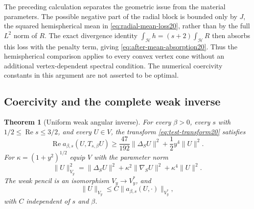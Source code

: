 \documentclass[11pt,a4paper]{article}
\newtheorem{theorem}{Theorem}[section]
\theoremstyle{remark}
\numberwithin{equation}{section}
\begin{document}
The preceding calculation separates the geometric issue from the material
parameters. The possible negative part of the radial block is bounded
only by $J$, the squared hemispherical mean in
\eqref{eq:radial-mean-loss20}, rather than by the full $L^2$ norm of
$R$. The exact divergence identity
$\int_{\mathcal H}h=(s+2)\int_{\mathcal H}R$ then absorbs this loss
with the penalty term, giving \eqref{eq:after-mean-absorption20}.
Thus the hemispherical comparison applies to every convex vertex
cone without an additional vertex-dependent spectral condition.
The numerical coercivity constants in this argument are not asserted
to be optimal.

\subsection{Coercivity and the complete weak inverse}

\begin{theorem}[Uniform weak angular inverse]\label{thm:weak-angular20}
For every $\beta>0$, every $s$ with $1/2\le\operatorname{Re}s\le3/2$,
and every $U\in V$, the transform \eqref{eq:test-transform20} satisfies
\begin{equation}\label{eq:weak-angular-coercivity20}
 \operatorname{Re}a_{\beta,s}(U,T_{s,\beta}U)
 \ge\frac{47}{192}\|\Delta_SU\|^2+\frac12y^4\|U\|^2.
\end{equation}
For $\kappa=(1+y^2)^{1/2}$ equip $V$ with the parameter norm
\[
 \|U\|_{V_y}^2=\|\Delta_SU\|^2+
 \kappa^2\|\nabla_SU\|^2+\kappa^4\|U\|^2.
\]
The weak pencil is an isomorphism $V_y\to V_y^*$, and
\begin{equation}\label{eq:weak-angular-inverse20}
 \|U\|_{V_y}\le C\|a_{\beta,s}(U,\cdot)\|_{V_y^*},
\end{equation}
with $C$ independent of $s$ and $\beta$.
\end{theorem}
\end{document}
